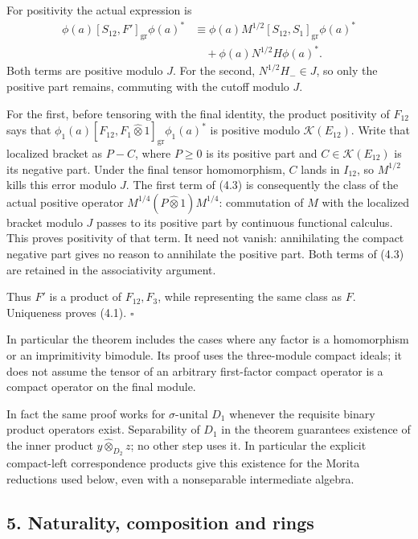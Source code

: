 \documentclass[
  11pt,
]{article}
\begin{document}
For positivity the actual expression is \[
\begin{aligned}
\phi(a)[S_{12},F']_{\mathrm{gr}}\phi(a)^*
&\equiv\phi(a)M^{1/2}[S_{12},S_1]_{\mathrm{gr}}\phi(a)^*\\
&\quad+\phi(a)N^{1/2}H\phi(a)^*.
\end{aligned}
\tag{4.3}
\] Both terms are positive modulo \(J\). For the second,
\(N^{1/2}H_-\in J\), so only the positive part remains, commuting with
the cutoff modulo \(J\).

For the first, before tensoring with the final identity, the product
positivity of \(F_{12}\) says that
\(\phi_1(a)[F_{12},F_1\widehat\otimes1]_{\mathrm{gr}}\phi_1(a)^*\) is
positive modulo \(\mathcal K(E_{12})\). Write that localized bracket as
\(P-C\), where \(P\geq0\) is its positive part and
\(C\in\mathcal K(E_{12})\) is its negative part. Under the final tensor
homomorphism, \(C\) lands in \(I_{12}\), so \(M^{1/2}\) kills this error
modulo \(J\). The first term of (4.3) is consequently the class of the
actual positive operator \(M^{1/4}(P\widehat\otimes1)M^{1/4}\):
commutation of \(M\) with the localized bracket modulo \(J\) passes to
its positive part by continuous functional calculus. This proves
positivity of that term. It need not vanish: annihilating the compact
negative part gives no reason to annihilate the positive part. Both
terms of (4.3) are retained in the associativity argument.

Thus \(F'\) is a product of \(F_{12},F_3\), while representing the same
class as \(F\). Uniqueness proves (4.1). \(\square\)

In particular the theorem includes the cases where any factor is a
homomorphism or an imprimitivity bimodule. Its proof uses the
three-module compact ideals; it does not assume the tensor of an
arbitrary first-factor compact operator is a compact operator on the
final module.

In fact the same proof works for \(\sigma\)-unital \(D_1\) whenever the
requisite binary product operators exist. Separability of \(D_1\) in the
theorem guarantees existence of the inner product
\(y\widehat\otimes_{D_2}z\); no other step uses it. In particular the
explicit compact-left correspondence products give this existence for
the Morita reductions used below, even with a nonseparable intermediate
algebra.

\subsection{5. Naturality, composition and
rings}\label{naturality-composition-and-rings}
\end{document}
